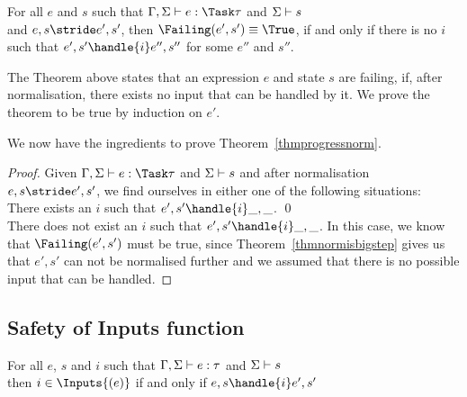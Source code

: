 \begin{theorem}
  For all $e$ and $s$ such that $\Gamma,\Sigma\infers e:\Task\tau$ and $\Sigma\vdash s$\\
  and $e,s\stride e',s'$, then $\Failing(e',s')\equiv \True$, if and only if there is no $i$ such that $e',s'\handle{i}e'',s''$ for some $e''$ and $s''$.
  \label{thmfailing}
\end{theorem}

The Theorem above states that an expression $e$ and state $s$ are failing, if,
after normalisation, there exists no input that can be handled by it.
We prove the theorem to be true by induction on $e'$.


We now have the ingredients to prove Theorem~\ref{thmprogressnorm}.

\begin{proof}
  Given $\Gamma,\Sigma\infers e:\Task\tau$ and $\Sigma\vdash s$ and after
  normalisation $e,s \stride e',s'$, we find ourselves in either one of the
  following situations:\\

  There exists an $i$ such that $e',s'\handle{i}\_,\_$. \qed\\

  There does not exist an $i$ such that $e',s'\handle{i}\_,\_$. In this case, we
  know that $\Failing(e',s')$ must be true, since Theorem~\ref{thmnormisbigstep}
  gives us that $e',s'$ can not be normalised further and we assumed that there
  is no possible input that can be handled.
\end{proof}



\subsection{Safety of Inputs function}

\begin{theorem}
  For all $e$, $s$ and $i$ such that $\Gamma,\Sigma\vdash e:\tau$ and $\Sigma\vdash s$\\
  then $i\in\Inputs{(e)}$ if and only if $e,s\handle{i}e',s'$
  \label{thmsafetyi}
\end{theorem}
